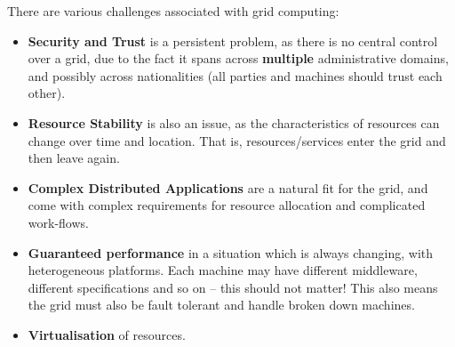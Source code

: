 \documentclass{article}
\begin{document}
There are various challenges associated with grid computing:
\begin{itemize}
	\item \textbf{Security and Trust} is a persistent problem, as there is no central control over a grid, due to the fact it spans across \textbf{multiple} administrative domains, and possibly across nationalities (all parties and machines should trust each other).
	\item \textbf{Resource Stability} is also an issue, as the characteristics of resources can change over time and location. That is, resources/services enter the grid and then leave again.
	\item \textbf{Complex Distributed Applications} are a natural fit for the grid, and come with complex requirements for resource allocation and complicated work-flows.
	\item \textbf{Guaranteed performance} in a situation which is always changing, with heterogeneous platforms. Each machine may have different middleware, different specifications and so on -- this should not matter! This also means the grid must also be fault tolerant and handle broken down machines.
	\item \textbf{Virtualisation} of resources.
\end{itemize}
\end{document}
